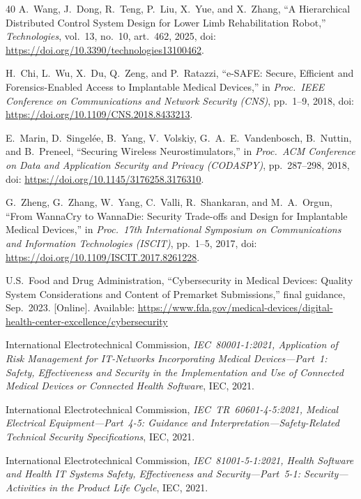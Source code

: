 \documentclass[journal]{IEEEtran}
\begin{document}
\begin{thebibliography}{40}
A.~Wang, J.~Dong, R.~Teng, P.~Liu, X.~Yue, and X.~Zhang, ``A Hierarchical Distributed Control System Design for Lower Limb Rehabilitation Robot,'' \emph{Technologies}, vol.~13, no.~10, art.~462, 2025, doi: \url{https://doi.org/10.3390/technologies13100462}.

H.~Chi, L.~Wu, X.~Du, Q.~Zeng, and P.~Ratazzi, ``e-SAFE: Secure, Efficient and Forensics-Enabled Access to Implantable Medical Devices,'' in \emph{Proc.\ IEEE Conference on Communications and Network Security (CNS)}, pp.~1--9, 2018, doi: \url{https://doi.org/10.1109/CNS.2018.8433213}.

E.~Marin, D.~Singelée, B.~Yang, V.~Volskiy, G.~A.~E.~Vandenbosch, B.~Nuttin, and B.~Preneel, ``Securing Wireless Neurostimulators,'' in \emph{Proc.\ ACM Conference on Data and Application Security and Privacy (CODASPY)}, pp.~287--298, 2018, doi: \url{https://doi.org/10.1145/3176258.3176310}.


G.~Zheng, G.~Zhang, W.~Yang, C.~Valli, R.~Shankaran, and M.~A.~Orgun, ``From WannaCry to WannaDie: Security Trade-offs and Design for Implantable Medical Devices,'' in \emph{Proc.\ 17th International Symposium on Communications and Information Technologies (ISCIT)}, pp.~1--5, 2017, doi: \url{https://doi.org/10.1109/ISCIT.2017.8261228}.

U.S.~Food and Drug Administration, ``Cybersecurity in Medical Devices: Quality System Considerations and Content of Premarket Submissions,'' final guidance, Sep.~2023. [Online]. Available: \url{https://www.fda.gov/medical-devices/digital-health-center-excellence/cybersecurity}


International Electrotechnical Commission, \emph{IEC~80001-1:2021, Application of Risk Management for IT-Networks Incorporating Medical Devices---Part~1: Safety, Effectiveness and Security in the Implementation and Use of Connected Medical Devices or Connected Health Software}, IEC, 2021.

International Electrotechnical Commission, \emph{IEC~TR~60601-4-5:2021, Medical Electrical Equipment---Part~4-5: Guidance and Interpretation---Safety-Related Technical Security Specifications}, IEC, 2021.

International Electrotechnical Commission, \emph{IEC~81001-5-1:2021, Health Software and Health IT Systems Safety, Effectiveness and Security---Part~5-1: Security---Activities in the Product Life Cycle}, IEC, 2021.


\end{thebibliography}
\end{document}
